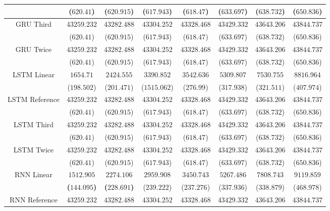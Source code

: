 \begin{table}[!ht]
{\begin{tabular}{|c|c|c|c|c|c|c|c|}
			 & ($620.41$) & ($620.915$) & ($617.943$) & ($618.47$) & ($633.697$) & ($638.732$) & ($650.836$) \\ \hline
			\multirow{2}{*}{GRU Third} & $43259.232$ & $43282.488$ & $43304.252$ & $43328.468$ & $43429.332$ & $43643.206$ & $43844.737$ \\
			 & ($620.41$) & ($620.915$) & ($617.943$) & ($618.47$) & ($633.697$) & ($638.732$) & ($650.836$) \\ \hline
			\multirow{2}{*}{GRU Twice} & $43259.232$ & $43282.488$ & $43304.252$ & $43328.468$ & $43429.332$ & $43643.206$ & $43844.737$ \\
			 & ($620.41$) & ($620.915$) & ($617.943$) & ($618.47$) & ($633.697$) & ($638.732$) & ($650.836$) \\ \hline
			\multirow{2}{*}{LSTM Linear} & $1654.71$ & $2424.555$ & $3390.852$ & $3542.636$ & $5309.807$ & $7530.755$ & $8816.964$ \\
			 & ($198.502$) & ($201.471$) & ($1515.062$) & ($276.99$) & ($317.938$) & ($321.511$) & ($407.974$) \\ \hline
			\multirow{2}{*}{LSTM Reference} & $43259.232$ & $43282.488$ & $43304.252$ & $43328.468$ & $43429.332$ & $43643.206$ & $43844.737$ \\
			 & ($620.41$) & ($620.915$) & ($617.943$) & ($618.47$) & ($633.697$) & ($638.732$) & ($650.836$) \\ \hline
			\multirow{2}{*}{LSTM Third} & $43259.232$ & $43282.488$ & $43304.252$ & $43328.468$ & $43429.332$ & $43643.206$ & $43844.737$ \\
			 & ($620.41$) & ($620.915$) & ($617.943$) & ($618.47$) & ($633.697$) & ($638.732$) & ($650.836$) \\ \hline
			\multirow{2}{*}{LSTM Twice} & $43259.232$ & $43282.488$ & $43304.252$ & $43328.468$ & $43429.332$ & $43643.206$ & $43844.737$ \\
			 & ($620.41$) & ($620.915$) & ($617.943$) & ($618.47$) & ($633.697$) & ($638.732$) & ($650.836$) \\ \hline
			\multirow{2}{*}{RNN Linear} & $\mathbf{1512.905}$ & $\mathbf{2274.106}$ & $2959.908$ & $3450.743$ & $5267.486$ & $7808.743$ & $9119.859$ \\
			 & \textbf{(}$\mathbf{144.095}$\textbf{)} & \textbf{(}$\mathbf{228.691}$\textbf{)} & ($239.222$) & ($237.276$) & ($337.936$) & ($338.879$) & ($468.978$) \\ \hline
			\multirow{2}{*}{RNN Reference} & $43259.232$ & $43282.488$ & $43304.252$ & $43328.468$ & $43429.332$ & $43643.206$ & $43844.737$ \\

\end{tabular}}
\end{table}

